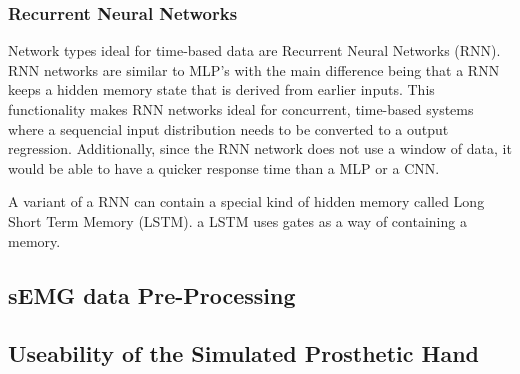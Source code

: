\documentclass[../main.tex]{subfiles}
\begin{document}


\subsubsection{Recurrent Neural Networks}

Network types ideal for time-based data are Recurrent Neural Networks (RNN).
RNN networks are similar to MLP's with the main difference being that a RNN keeps a hidden memory state that is derived from earlier inputs.
This functionality makes RNN networks ideal for concurrent, time-based systems where a sequencial input distribution needs to be converted to a output regression.  
Additionally, since the RNN network does not use a window of data, it would be able to have a quicker response time than a MLP or a CNN.

A variant of a RNN can contain a special kind of hidden memory called Long Short Term Memory (LSTM).
a LSTM uses gates as a way of containing a memory.


%

\subsection{sEMG data Pre-Processing}


\subsection{Useability of the Simulated Prosthetic Hand}
\end{document}
